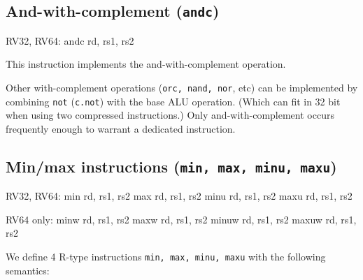 


\subsection{And-with-complement (\texttt{andc})}

\begin{rvb}
  RV32, RV64:
    andc rd, rs1, rs2
\end{rvb}

This instruction implements the and-with-complement operation.



Other with-complement operations ({\tt orc, nand, nor}, etc) can be implemented
by combining {\tt not} ({\tt c.not}) with the base ALU operation. (Which can
fit in 32 bit when using two compressed instructions.) Only and-with-complement
occurs frequently enough to warrant a dedicated instruction.

%
%
%


\subsection{Min/max instructions (\texttt{min, max, minu, maxu})}

\begin{rvb}
  RV32, RV64:
    min rd, rs1, rs2
    max rd, rs1, rs2
    minu rd, rs1, rs2
    maxu rd, rs1, rs2

  RV64 only:
    minw rd, rs1, rs2
    maxw rd, rs1, rs2
    minuw rd, rs1, rs2
    maxuw rd, rs1, rs2
\end{rvb}

We define 4 R-type instructions \texttt{min, max, minu, maxu} with the
following semantics:



